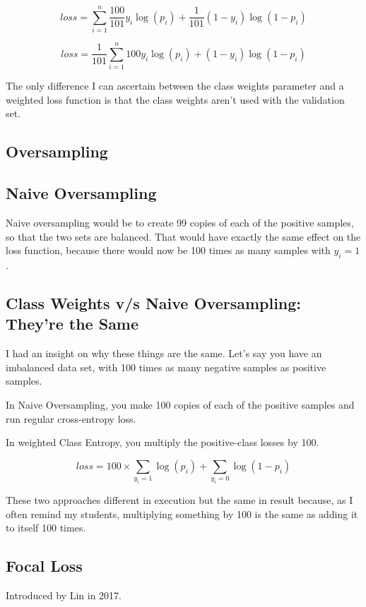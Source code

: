 $$loss = \sum_{i=1}^n \frac{100}{101} y_i \log(p_i) + \frac{1}{101} (1-y_i) \log (1 - p_i)$$

$$loss = \frac{1}{101}\sum_{i=1}^n 100 y_i \log(p_i) + (1-y_i) \log (1 - p_i)$$

The only difference I can ascertain between the class weights parameter and a weighted loss function is that the class weights aren't used with the validation set.  

\subsection{Oversampling}
\subsection{Naive Oversampling}

Naive oversampling would be to create 99 copies of each of the positive samples, so that the two sets are balanced.  That would have exactly the same effect on the loss function, because there would now be 100 times as many samples with $y_i=1$.  

\subsection{Class Weights v/s Naive Oversampling: They're the Same}

I had an insight on why these things are the same.  Let's say you have an imbalanced data set, with 100 times as many negative samples as positive samples.  

In Naive Oversampling, you make 100 copies of each of the positive samples and run regular cross-entropy loss.  

In weighted Class Entropy, you multiply the positive-class losses by 100.

$$loss = 100 \times \sum_{y_i=1} \log (p_i) +  \sum_{y_i=0} \log (1-p_i)$$

These two approaches different in execution but the same in result because, as I often remind my students, multiplying something by 100 is the same as adding it to itself 100 times.  



\subsection{Focal Loss}

Introduced by Lin in 2017.  \cite{LIN_2020}


